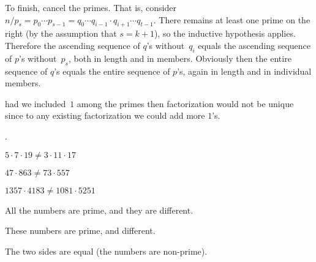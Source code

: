 \documentclass{ibl}
\begin{document}
\begin{ex}
\begin{ans}
\begin{exes}
To finish, cancel the primes.
That is, consider 
$n/p_s=p_0\cdots p_{s-1}=q_0\cdots q_{i-1}\cdot q_{i+1}\cdots q_{t-1}$.
There remains at least one prime on the right (by the assumption that $s=k+1$),
so the inductive hypothesis applies. 
Therefore
the ascending sequence of $q$'s without~$q_i$ 
equals the ascending sequence of $p$'s without~$p_s$,
both in length and in members. 
Obviously then the entire sequence of $q$'s equals the entire sequence of
$p$'s, again in length and in individual members. 
\end{exes}
\end{ans}
\end{ex}

\noindent\remark had we included~$1$ among the primes then 
factorization would not be unique 
since to any existing factorization we could add more $1$'s.

\begin{ex} \pord.
\begin{exes}
\item $5\cdot 7\cdot 19\neq 3\cdot 11\cdot 17$
\item $47\cdot 863\neq 73\cdot 557$
\item $1357\cdot 4183\neq 1081\cdot 5251$ %
\end{exes}
\begin{ans}
\begin{exes}
\item All the numbers are prime, and they are different.
\item These numbers are prime, and different.
\item The two sides are equal (the numbers are non-prime).     
\end{exes}
\end{ans}
\end{ex}

\end{document}
